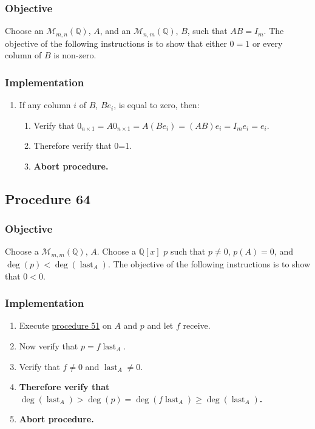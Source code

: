 \documentclass[twocolumn]{article}
\DeclareMathOperator{\last}{last}
\begin{document}
			\subsubsection{Objective}
				Choose an $\mathcal{M}_{m,n}(\mathbb{Q})$, $A$, and an $\mathcal{M}_{n,m}(\mathbb{Q})$, $B$, such that $AB=I_m$. The objective of the following instructions is to show that either $0=1$ or every column of $B$ is non-zero.
			\subsubsection{Implementation}
				\begin{enumerate}
					\item If any column $i$ of $B$, $Be_i$, is equal to zero, then:
					\begin{enumerate}
						\item Verify that $0_{n\times 1}=A0_{n\times 1}=A(Be_i)=(AB)e_i=I_me_i=e_i$.
						\item Therefore verify that 0=1.
						\item \textbf{Abort procedure.}
					\end{enumerate}
				\end{enumerate}
		\subsection{Procedure 64}\label{sec:procedure 64}
			\subsubsection{Objective}
				Choose a $\mathcal{M}_{m,m}(\mathbb{Q})$, $A$. Choose a $\mathbb{Q}[x]$ $p$ such that $p\ne 0$, $p(A)=0$, and $\deg(p)<\deg(\last_A)$. The objective of the following instructions is to show that $0<0$.
			\subsubsection{Implementation}
				\begin{enumerate}
					\item Execute \hyperref[sec:procedure 51]{procedure 51} on $A$ and $p$ and let $f$ receive.
					\item Now verify that $p=f\last_A$.
					\item Verify that $f\ne 0$ and $\last_A\ne 0$.
					\item \textbf{Therefore verify that $\deg(\last_A)>\deg(p)=\deg(f\last_A)\ge\deg(\last_A)$.}
					\item \textbf{Abort procedure.}
				\end{enumerate}
\end{document}
